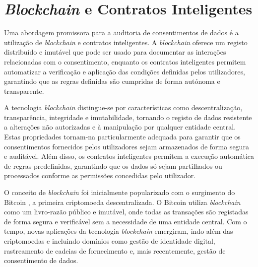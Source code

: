 
\section{\textit{{Blockchain}} e Contratos Inteligentes}

Uma abordagem promissora para a auditoria de consentimentos de dados é a utilização de \textit{blockchain} e contratos inteligentes. A \textit{blockchain} oferece um registo distribuído e imutável que pode ser usado para documentar as interações relacionadas com o consentimento, enquanto os contratos inteligentes permitem automatizar a verificação e aplicação das condições definidas pelos utilizadores, garantindo que as regras definidas são cumpridas de forma autónoma e transparente.

A tecnologia \textit{blockchain} distingue-se por características como descentralização, transparência, integridade e imutabilidade, tornando o registo de dados resistente a alterações não autorizadas e à manipulação por qualquer entidade central. Estas propriedades tornam-na particularmente adequada para garantir que os consentimentos fornecidos pelos utilizadores sejam armazenados de forma segura e auditável. Além disso, os contratos inteligentes permitem a execução automática de regras predefinidas, garantindo que os dados só sejam partilhados ou processados conforme as permissões concedidas pelo utilizador.

O conceito de \textit{blockchain} foi inicialmente popularizado com o surgimento do Bitcoin \citep{nakamoto2008bitcoin}, a primeira criptomoeda descentralizada. O Bitcoin utiliza \textit{blockchain} como um livro-razão público e imutável, onde todas as transações são registadas de forma segura e verificável sem a necessidade de uma entidade central. Com o tempo, novas aplicações da tecnologia \textit{blockchain} emergiram, indo além das criptomoedas e incluindo domínios como gestão de identidade digital, rastreamento de cadeias de fornecimento e, mais recentemente, gestão de consentimento de dados.

